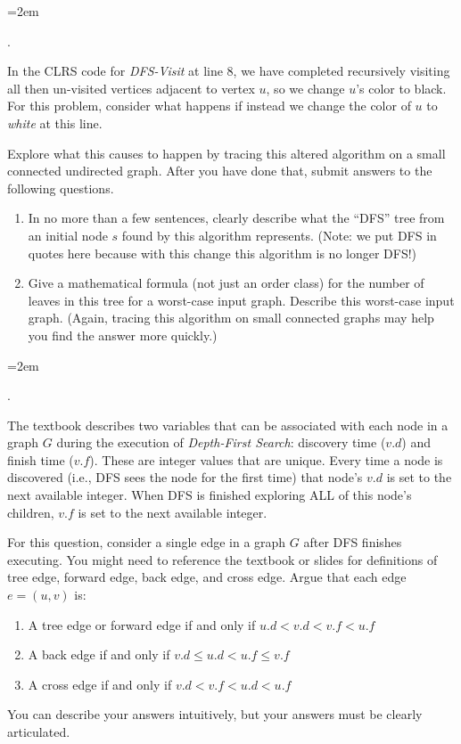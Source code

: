 \documentclass[12pt]{article}
\newcounter{quesnum}
\newcommand{\question}[2][??]{
\begin{list}{\labelitemi}{\leftmargin=2em}
\item [\arabic{quesnum}.] {#2}
\end{list}
\addtocounter{quesnum}{1}
}
\begin{document}



\iffalse

\question[1]{
In the CLRS code for {\em DFS-Visit} at line 8,  we have completed recursively visiting all then un-visited vertices adjacent to vertex $u$, so we change $u$'s color to black.  For this problem, consider what happens if instead we change the color of $u$ to {\em white} at this line.

Explore what this causes to happen by tracing this altered algorithm on a small connected undirected graph.  After you have done that, submit answers to the following questions.

\begin{enumerate}
\renewcommand{\theenumi}{\Alph{enumi}}
\item In no more than a few sentences, clearly describe what the ``DFS'' tree from an initial node $s$ found by this algorithm represents.  (Note:  we put DFS in quotes here because with this change this algorithm is no longer DFS!)
\item Give a mathematical formula (not just an order class) for the number of leaves in this tree for a worst-case input graph.  Describe this worst-case input graph.  (Again, tracing this algorithm on small connected graphs may help you find the answer more quickly.)
\end{enumerate}

}

\question[1]{
The textbook describes two variables that can be associated with each node in a graph $G$ during the execution of \emph{Depth-First Search}: discovery time ($v.d$) and finish time ($v.f$). These are integer values that are unique. Every time a node is discovered (i.e., DFS sees the node for the first time) that node's $v.d$ is set to the next available integer. When DFS is finished exploring ALL of this node's children, $v.f$ is set to the next available integer.

For this question, consider a single edge in a graph $G$ after DFS finishes executing. You might need to reference the textbook or slides for definitions of tree edge, forward edge, back edge, and cross edge. Argue that each edge $e=(u,v)$ is:

\begin{enumerate}
\item A tree edge or forward edge if and only if $u.d < v.d < v.f < u.f$
\item A back edge if and only if $v.d \leq u.d < u.f \leq v.f$
\item A cross edge if and only if $v.d < v.f < u.d < u.f$
\end{enumerate}

You can describe your answers intuitively, but your answers must be clearly articulated.
}
\end{document}
